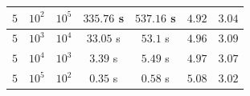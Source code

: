\documentclass[aspectratio=169]{beamer}
\begin{document}
\begin{frame}
\begin{table}[]
\begin{tabular}{|ccccccc|}
\multicolumn{1}{|c|}{$5$}                                                                                   & \multicolumn{1}{c|}{$10^2$}                                                                                        & \multicolumn{1}{c|}{$10^5$}                                                                              & \multicolumn{1}{c|}{$335.76$ s}                                               & \multicolumn{1}{c|}{$537.16$ s}                                               & \multicolumn{1}{c|}{$4.92$}                                                      & $3.04$                                                      \\ \hline
\multicolumn{1}{|c|}{$5$}                                                                                   & \multicolumn{1}{c|}{$10^3$}                                                                                        & \multicolumn{1}{c|}{$10^4$}                                                                              & \multicolumn{1}{c|}{$33.05$ s}                                                & \multicolumn{1}{c|}{$53.1$ s}                                                 & \multicolumn{1}{c|}{$4.96$}                                                      & $3.09$                                                      \\ \hline
\multicolumn{1}{|c|}{$5$}                                                                                   & \multicolumn{1}{c|}{$10^4$}                                                                                        & \multicolumn{1}{c|}{$10^3$}                                                                              & \multicolumn{1}{c|}{$3.39$ s}                                                 & \multicolumn{1}{c|}{$5.49$ s}                                                 & \multicolumn{1}{c|}{$4.97$}                                                      & $3.07$                                                      \\ \hline
\multicolumn{1}{|c|}{$5$}                                                                                   & \multicolumn{1}{c|}{$10^5$}                                                                                        & \multicolumn{1}{c|}{$10^2$}                                                                              & \multicolumn{1}{c|}{$0.35$ s}                                                 & \multicolumn{1}{c|}{$0.58$ s}                                                 & \multicolumn{1}{c|}{$5.08$}                                                      & $3.02$                                                      \\ \hline
\end{tabular}
\end{table}
\end{frame}
\end{document}
